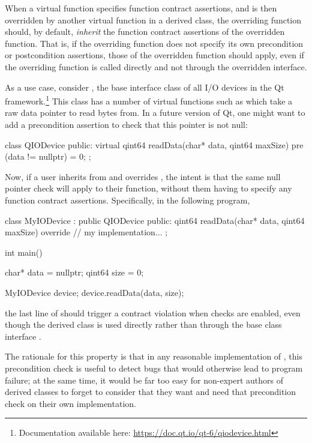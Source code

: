 When a virtual function specifies function contract assertions, and is then overridden by another virtual function in a derived class, the overriding function should, by default, \emph{inherit} the function contract assertions of the overridden function. That is, if the overriding function does not specify its own precondition or postcondition assertions, those of the overridden function should apply, even if the overriding function is called directly and not through the overridden interface.

As a use case, consider , the base interface class of all I/O devices in the Qt framework.\footnote{Documentation available here: \url{https://doc.qt.io/qt-6/qiodevice.html}} This class has a number of virtual functions such as  which take a raw data pointer to read bytes from. In a future version of Qt, one might want to add a precondition assertion to check that this pointer is not null:
\begin{codeblock}
class QIODevice {
public:
  virtual qint64 readData(char* data, qint64 maxSize)
    pre (data != nullptr) = 0;
};
\end{codeblock}
Now, if a user inherits from  and overrides , the intent is that the same null pointer check will apply to their function, without them having to specify any function contract assertions. Specifically, in the following program,
\begin{codeblock}
class MyIODevice : public QIODevice {
public:
  qint64 readData(char* data, qint64 maxSize) override {
    // my implementation...
  }
};

int main() {
  char* data = nullptr;
  qint64 size = 0;
  
  MyIODevice device;
  device.readData(data, size);
}
\end{codeblock}
the last line of  should trigger a contract violation when checks are enabled, even though the derived class  is used directly rather than through the base class interface . 

The rationale for this property is that in any reasonable implementation of , this precondition check is useful to detect bugs that would otherwise lead to program failure; at the same time, it would be far too easy for non-expert authors of derived classes to forget to consider that they want and need that precondition check on their own implementation.

